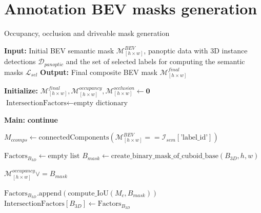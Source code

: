 \section{Annotation BEV masks generation} \label{appendix:bev_masks_generation}
\begin{algorithm}
    \caption{Occupancy, occlusion and driveable mask generation}
    \label{algorithm:occ_masks}
    \scriptsize

    \begin{algorithmic}[1]
        \State \textbf{Input:} Initial BEV semantic mask $\mathcal{M}^{BEV}_{\left[h \times w\right]}$, panoptic data with 3D instance detections  $\mathcal{D}_{panoptic}$ and the set of selected labels for computing the semantic masks $\mathcal{L}_{sel}$
        \State \textbf{Output:} Final composite BEV mask $\mathcal{M}^{final}_{\left[h \times w\right]}$
        
        \State \textbf{Initialize:}
        \State $\mathcal{M}^{final}_{\left[h \times w\right]}, \mathcal{M}^{occupancy}_{\left[h \times w\right]}, \mathcal{M}^{occlusion}_{\left[h \times w\right]} \gets \mathbf{0}$
        \State $\text{IntersectionFactors} \gets \text{empty dictionary}$ 
        
        \State \textbf{Main:}        
                \State \textbf{continue}
            \EndIf
        
            \State $M_{ccomps} \gets \text{connectedComponents}(\mathcal{M}^{BEV}_{\left[h \times w\right]} == \mathcal{I}_{sem}[\text{'label\_id'}])$



             
                \State $\text{Factors}_{B_{3D}} \gets \text{empty list}$
                \State $B_{mask} \gets \text{create\_binary\_mask\_of\_cuboid\_base}(B_{3D}, h, w)$
                
                \State $\mathcal{M}^{occupancy}_{\left[h \times w\right]} \lor = B_{mask}$

                    \State $\text{Factors}_{B_{3D}}.\text{append}(\text{compute\_IoU}(M_{c}, B_{mask}))$
                \EndFor
                \State $\text{IntersectionFactors}[B_{3D}] \gets \text{Factors}_{B_{3D}}$
            \EndFor



\end{algorithmic}
\end{algorithm}
